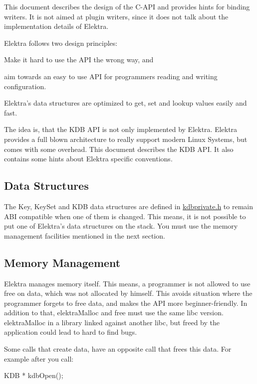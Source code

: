 This document describes the design of the C-\/\+A\+P\+I and provides hints for binding writers. It is not aimed at plugin writers, since it does not talk about the implementation details of Elektra.

Elektra follows two design principles\+:


\begin{DoxyEnumerate}
\item Make it hard to use the A\+P\+I the wrong way, and
\item aim towards an easy to use A\+P\+I for programmers reading and writing configuration.
\end{DoxyEnumerate}

Elektra's data structures are optimized to get, set and lookup values easily and fast.

The idea is, that the K\+D\+B A\+P\+I is not only implemented by Elektra. Elektra provides a full blown architecture to really support modern Linux Systems, but comes with some overhead. This document describes the {\ttfamily K\+D\+B} A\+P\+I. It also contains some hints about Elektra specific conventions.

\subsection*{Data Structures}

The {\ttfamily Key}, {\ttfamily Key\+Set} and {\ttfamily K\+D\+B} data structures are defined in {\ttfamily \hyperlink{kdbprivate_8h}{kdbprivate.\+h}} to remain A\+B\+I compatible when one of them is changed. This means, it is not possible to put one of Elektra's data structures on the stack. You must use the memory management facilities mentioned in the next section.

\subsection*{Memory Management}

Elektra manages memory itself. This means, a programmer is not allowed to use free on data, which was not allocated by himself. This avoids situation where the programmer forgets to free data, and makes the A\+P\+I more beginner-\/friendly. In addition to that, {\ttfamily elektra\+Malloc} and free must use the same libc version. {\ttfamily elektra\+Malloc} in a library linked against another libc, but freed by the application could lead to hard to find bugs.

Some calls that create data, have an opposite call that frees this data. For example after you call\+: \begin{DoxyVerb}KDB * kdbOpen();
\end{DoxyVerb}



